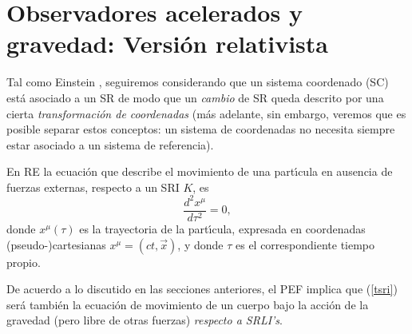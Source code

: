 \section{Observadores acelerados y gravedad: Versión  relativista}

Tal como Einstein \cite{Einstein56}, seguiremos considerando que un sistema coordenado (SC) está asociado a un SR de modo que un \textit{cambio} de SR queda descrito por una cierta \textit{transformación de  coordenadas} (más adelante, sin embargo, veremos que es posible separar estos conceptos: un sistema de coordenadas no necesita siempre estar asociado a un sistema de referencia).

En RE la ecuación que describe el movimiento de una part{\'\i}cula
en ausencia de fuerzas externas, respecto a un SRI $K$, es
\begin{equation}
\frac{d^2x^\mu}{d\tau ^2}=0, \label{tsri}
\end{equation}
donde $x^\mu(\tau )$ es la trayectoria de la part{\'\i}cula,
expresada en coordenadas (pseudo-)cartesianas $x^\mu=(ct,\vec{x})$, y donde $\tau $ es el correspondiente tiempo propio.

De acuerdo a lo discutido en las secciones anteriores, el PEF implica que (\ref{tsri}) será también la ecuación de movimiento de un cuerpo bajo la acción de la gravedad (pero libre de otras fuerzas) \textit{respecto a SRLI's}.

